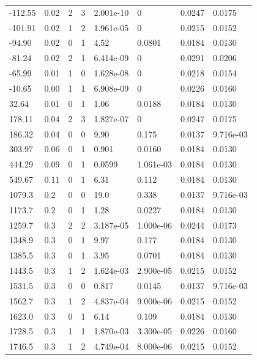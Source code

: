 \documentclass[preview]{standalone}
\begin{document}
{{\begin{tabular}{L{1.2cm}C{1.2cm} C{0.3cm}C{0.5cm} C{1.4cm}C{1.4cm} C{1.4cm}C{1.4cm}}
  -112.55  &  0.02  & 2     &  3 &  2.001e-10  & 0  & 0.0247 &  0.0175   \\ 
  -101.91  &  0.02  & 1     &  2 &  1.961e-05  & 0  & 0.0215 &  0.0152   \\ 
  -94.90  &  0.02  & 0     &  1 &  4.52  & 0.0801  & 0.0184 &  0.0130   \\ 
  -81.24  &  0.02  & 2     &  1 &  6.414e-09  & 0  & 0.0291 &  0.0206   \\ 
  -65.99  &  0.01  & 1     &  0 &  1.628e-08  & 0  & 0.0218 &  0.0154   \\ 
  -10.65  &  0.00  & 1     &  1 &  6.908e-09  & 0  & 0.0226 &  0.0160   \\ 
  32.64  &  0.01  & 0     &  1 &  1.06  & 0.0188  & 0.0184 &  0.0130   \\ 
  178.11  &  0.04  & 2     &  3 &  1.827e-07  & 0  & 0.0247 &  0.0175   \\ 
  186.32  &  0.04  & 0     &  0 &  9.90  & 0.175  & 0.0137 &  9.716e-03   \\ 
  303.97  &  0.06  & 0     &  1 &  0.901  & 0.0160  & 0.0184 &  0.0130   \\ 
  444.29  &  0.09  & 0     &  1 &  0.0599  & 1.061e-03  & 0.0184 &  0.0130   \\ 
  549.67  &  0.11  & 0     &  1 &  6.31  & 0.112  & 0.0184 &  0.0130   \\ 
  1079.3  &   0.2  & 0     &  0 &  19.0  & 0.338  & 0.0137 &  9.716e-03   \\ 
  1173.7  &   0.2  & 0     &  1 &  1.28  & 0.0227  & 0.0184 &  0.0130   \\ 
  1259.7  &   0.3  & 2     &  2 &  3.187e-05  & 1.000e-06  & 0.0244 &  0.0173   \\ 
  1348.9  &   0.3  & 0     &  1 &  9.97  & 0.177  & 0.0184 &  0.0130   \\ 
  1385.5  &   0.3  & 0     &  1 &  3.95  & 0.0701  & 0.0184 &  0.0130   \\ 
  1443.5  &   0.3  & 1     &  2 &  1.624e-03  & 2.900e-05  & 0.0215 &  0.0152   \\ 
  1531.5  &   0.3  & 0     &  0 &  0.817  & 0.0145  & 0.0137 &  9.716e-03   \\ 
  1562.7  &   0.3  & 1     &  2 &  4.837e-04  & 9.000e-06  & 0.0215 &  0.0152   \\ 
  1623.0  &   0.3  & 0     &  1 &  6.14  & 0.109  & 0.0184 &  0.0130   \\ 
  1728.5  &   0.3  & 1     &  1 &  1.870e-03  & 3.300e-05  & 0.0226 &  0.0160   \\ 
  1746.5  &   0.3  & 1     &  2 &  4.749e-04  & 8.000e-06  & 0.0215 &  0.0152   \\ 

\end{tabular}}}
\end{document}
